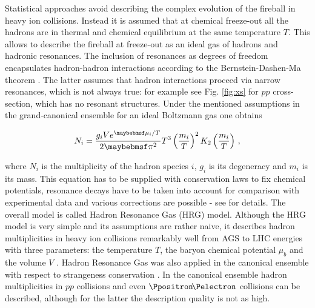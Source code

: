 Statistical approaches avoid describing the complex evolution of the fireball
in heavy ion collisions. Instead it is assumed that at chemical freeze-out all
the hadrons are in thermal and chemical equilibrium at the same temperature
$T$.  This allows to describe the fireball at freeze-out as an ideal gas of
hadrons and hadronic resonances. The inclusion of resonances as degrees of
freedom encapsulates hadron-hadron interactions according to the Bernstein-Dashen-Ma
theorem \cite{Dashen:1969ep}. The latter assumes that hadron interactions
proceed via narrow resonances, which is not always true: for example see Fig.
\ref{fig:xs} for $pp$ cross-section, which has no resonant structures.
Under the mentioned assumptions in the grand-canonical ensemble for an
ideal Boltzmann gas one obtains

\begin{equation}
  N_{i} = \frac{g_i V e^{\mu_i/T}}{2\pi^2} T^3 \parenths{\frac{m_i}{T}}^2 K_2\parenths{\frac{m_i}{T}} \,,
\end{equation}

where $N_i$ is the multiplicity of the hadron species $i$, $g_i$ is its degeneracy
and $m_i$ is its mass. This equation has to be supplied with conservation laws to
fix chemical potentials, resonance decays have to be taken into account for
comparison with experimental data and various corrections are possible - see
\cite{Andronic:2005yp,Oliinychenko:2012hj} for details. The overall model is
called Hadron Resonance Gas (HRG) model.  Although the HRG model is very simple and
its assumptions are rather naive, it describes hadron multiplicities in heavy
ion collisions remarkably well from AGS to LHC energies with three parameters:
the temperature $T$, the baryon chemical potential $\mu_b$ and the volume $V$
\cite{Becattini:2000jw,Andronic:2003zv,Andronic:2005yp,Cleymans:2005xv,Andronic:2008gu,Andronic:2011yq}.
Hadron Resonance Gas was also applied in the canonical ensemble with respect to strangeness conservation
\cite{Hagedorn:1984uy,Cleymans:1998yb,Begun:2006uu}. In the canonical ensemble
hadron multiplicities in $pp$ collisions \cite{Hamieh:2000tk}
and even $\epluseminus$ collisions \cite{Andronic:2008ev} can be described,
although for the latter the description quality is not as high.

